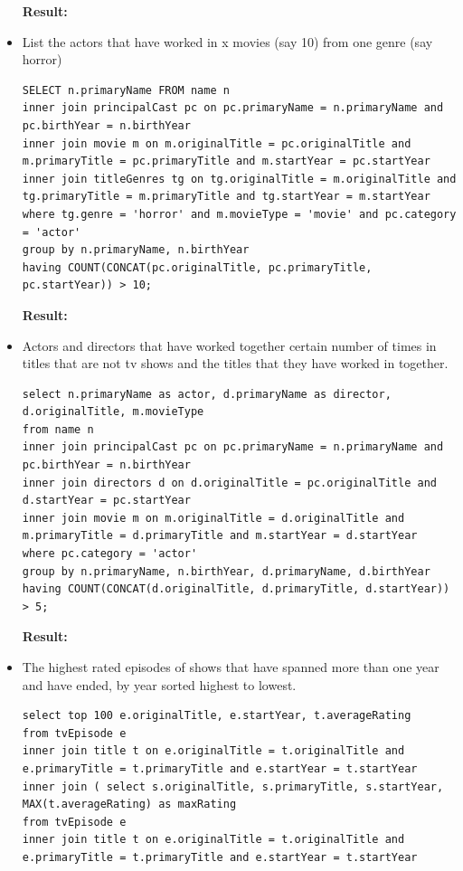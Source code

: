 \documentclass{sig-alternate}
\begin{document}
\begin{itemize}
\begin{lstlisting}
                \end{lstlisting}
                \textbf{Result:}
		\item List the actors that have worked in x movies (say 10) from one genre (say horror)
                \begin{lstlisting}
SELECT n.primaryName FROM name n
inner join principalCast pc on pc.primaryName = n.primaryName and pc.birthYear = n.birthYear
inner join movie m on m.originalTitle = pc.originalTitle and m.primaryTitle = pc.primaryTitle and m.startYear = pc.startYear
inner join titleGenres tg on tg.originalTitle = m.originalTitle and tg.primaryTitle = m.primaryTitle and tg.startYear = m.startYear
where tg.genre = 'horror' and m.movieType = 'movie' and pc.category = 'actor'
group by n.primaryName, n.birthYear
having COUNT(CONCAT(pc.originalTitle, pc.primaryTitle, pc.startYear)) > 10;
                \end{lstlisting}
                \textbf{Result:}
		\item Actors and directors that have worked together certain number of times in titles that are not tv shows and the titles that they have worked in together.
                \begin{lstlisting}
select n.primaryName as actor, d.primaryName as director, d.originalTitle, m.movieType
from name n
inner join principalCast pc on pc.primaryName = n.primaryName and pc.birthYear = n.birthYear
inner join directors d on d.originalTitle = pc.originalTitle and d.startYear = pc.startYear
inner join movie m on m.originalTitle = d.originalTitle and m.primaryTitle = d.primaryTitle and m.startYear = d.startYear
where pc.category = 'actor'
group by n.primaryName, n.birthYear, d.primaryName, d.birthYear
having COUNT(CONCAT(d.originalTitle, d.primaryTitle, d.startYear)) > 5;
                \end{lstlisting}
                \textbf{Result:}
		\item The highest rated episodes of shows that have spanned more than one year and have ended, by year sorted highest to lowest.
                \begin{lstlisting}
select top 100 e.originalTitle, e.startYear, t.averageRating
from tvEpisode e
inner join title t on e.originalTitle = t.originalTitle and e.primaryTitle = t.primaryTitle and e.startYear = t.startYear
inner join ( select s.originalTitle, s.primaryTitle, s.startYear, MAX(t.averageRating) as maxRating
from tvEpisode e
inner join title t on e.originalTitle = t.originalTitle and e.primaryTitle = t.primaryTitle and e.startYear = t.startYear

\end{lstlisting}
\end{itemize}
\end{document}
